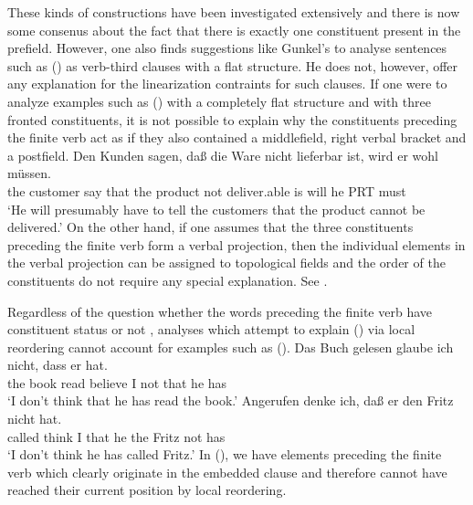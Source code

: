 These kinds of constructions have been investigated extensively and there is now some consenus about the fact that
there is exactly one constituent present in the prefield.
However, one also finds suggestions like Gunkel's \citeyearpar[--171]{Gunkel2003b} to analyse sentences such as () as verb-third
clauses with a flat structure. He does not, however, offer any explanation for the linearization contraints
for such clauses. If one were to analyze examples such as () with a completely flat structure and with
three fronted constituents, it is not possible to explain why the constituents preceding the finite verb
act as if they also contained a middlefield, right verbal bracket and a postfield.
\ea
\gll Den Kunden sagen, daß die Ware nicht lieferbar ist, wird er wohl müssen.\\
	 the customer say that the product not deliver.able is will he PRT must\\
\glt `He will presumably have to tell the customers that the product cannot be delivered.' 
\z
On the other hand, if one assumes that the three constituents preceding the finite verb form
a verbal projection, then the individual elements in the verbal projection can be assigned to
topological fields and the order of the constituents do not require any special explanation.
See .
	
Regardless of the question whether the words preceding the finite verb have constituent status
\citep{Kathol95a} or not \citep{Gunkel2003b}, analyses which attempt to explain () via local reordering
cannot account for examples such as ().
\eal
\ex 
\gll Das Buch gelesen glaube ich nicht, dass er hat.\footnotemark\\
     the book read believe I not that he has\\
\glt `I don't think that he has read the book.'
\ex 
\gll Angerufen denke ich, daß er den Fritz nicht hat.\footnotemark\\
     called think I that he the Fritz not has\\
\glt `I don't think he has called Fritz.'
\zl
In (), we have elements preceding the finite verb which clearly originate in the
embedded clause and therefore cannot have reached their current position by local reordering.%



